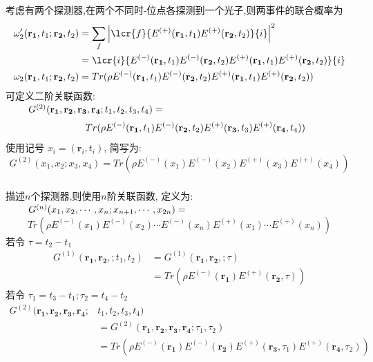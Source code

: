    \begin{frame} 
    \frametitle{}
    {\Bullet}考虑有两个探测器,在两个不同时-位点各探测到一个光子,则两事件的联合概率为
    \[ \begin{aligned}
        \omega'_2(\mathbf{r_1}, t_1;\mathbf{r_2}, t_2) &= \sum_f \left| \lcr{f}{E^{(+)}(\mathbf{r_1}, t_1)E^{(+)}(\mathbf{r_2}, t_2)}{i} \right|^2 \\ 
        &= \lcr{i}{E^{(-)}(\mathbf{r_1}, t_1)E^{(-)}(\mathbf{r_2}, t_2)E^{(+)}(\mathbf{r_1}, t_1)E^{(+)}(\mathbf{r_2}, t_2)}{i} \\ 
        \omega_2(\mathbf{r_1}, t_1;\mathbf{r_2}, t_2)&=  Tr(\rho E^{(-)}(\mathbf{r_1}, t_1)E^{(-)}(\mathbf{r_2}, t_2)E^{(+)}(\mathbf{r_1}, t_1)E^{(+)}(\mathbf{r_2}, t_2) )
    \end{aligned}\] 
    可定义二阶关联函数:\\ 
    $~ {\hspace*{2em}} G^{(2)}(\mathbf{r_1}, \mathbf{r_2}, \mathbf{r_3}, \mathbf{r_4}; t_1, t_2, t_3, t_4) = $ \[ ~ {\hspace*{3em}} Tr(\rho E^{(-)}(\mathbf{r_1}, t_1)E^{(-)}(\mathbf{r_2}, t_2)E^{(+)}(\mathbf{r_3}, t_3)E^{(+)}(\mathbf{r_4}, t_4) ) \]
    使用记号 $x_i= (\mathbf{r}_i, t_i)$, 简写为:
    \[ G^{(2)}(x_1, x_2; x_3,x_4) = Tr(\rho E^{(-)}(x_1)E^{(-)}(x_2)E^{(+)}(x_3)E^{(+)}(x_4)) \]
\end{frame}

\begin{frame} 
      \frametitle{}
      {\Bullet} 描述$n$个探测器,则使用$n$阶关联函数, 定义为:\\ 
        $~ {\hspace*{2em}} G^{(n)}(x_1,x_2,\cdots, x_n;x_{n+1},\cdots, x_{2n})= $ 
        \[ Tr(\rho E^{(-)}(x_1)E^{(-)}(x_2)\cdots E^{(-)}(x_n) E^{(+)}(x_1)\cdots E^{(+)}(x_n)) \]
        若令 $\tau = t_2-t_1$
    \[\begin{aligned}
        G^{(1)}(\mathbf{r_1}, \mathbf{r_2},; t_1, t_2) &= G^{(1)}(\mathbf{r_1}, \mathbf{r_2},; \tau) \\ 
        &= Tr( \rho E^{(-)}(\mathbf{r_1})E^{(+)}(\mathbf{r_2}, \tau)) 
    \end{aligned} \]
    若令 $\tau_1 = t_3-t_1; \tau_2 = t_4-t_2$ \\
    \[\begin{aligned}
    G^{(2)}(\mathbf{r_1}, \mathbf{r_2}, \mathbf{r_3}, \mathbf{r_4}; & t_1, t_2, t_3, t_4) \\ 
    &= G^{(2)}(\mathbf{r_1}, \mathbf{r_2}, \mathbf{r_3}, \mathbf{r_4};\tau_1,\tau_2 )  \\
    &=  Tr(\rho E^{(-)}(\mathbf{r_1})E^{(-)}(\mathbf{r_2})E^{(+)}(\mathbf{r_3}, \tau_1)E^{(+)}(\mathbf{r_4}, \tau_2) ) 
   \end{aligned} \]
   \end{frame}

